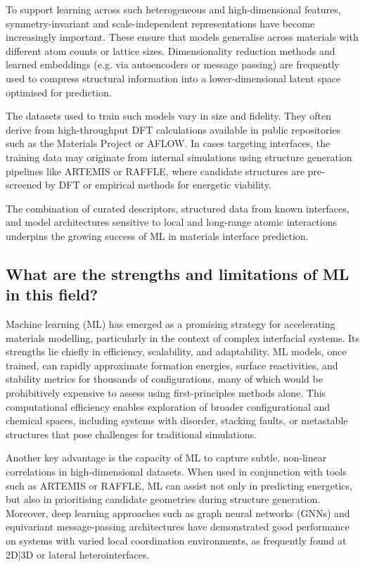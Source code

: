To support learning across such heterogeneous and high-dimensional features, symmetry-invariant and scale-independent
representations have become increasingly important. These ensure that models generalise across materials with different
atom counts or lattice sizes. Dimensionality reduction methods and learned embeddings (e.g. via autoencoders or message
passing) are frequently used to compress structural information into a lower-dimensional latent space optimised for
prediction.

The datasets used to train such models vary in size and fidelity. They often derive from high-throughput DFT
calculations available in public repositories such as the Materials Project or AFLOW. In cases targeting interfaces,
the training data may originate from internal simulations using structure generation pipelines like ARTEMIS or RAFFLE,
where candidate structures are pre-screened by DFT or empirical methods for energetic viability.

The combination of curated descriptors, structured data from known interfaces, and model architectures sensitive to
local and long-range atomic interactions underpins the growing success of ML in materials interface prediction.

\subsection{What are the strengths and limitations of ML in this field?}

Machine learning (ML) has emerged as a promising strategy for accelerating materials modelling, particularly in the
context of complex interfacial systems. Its strengths lie chiefly in efficiency, scalability, and adaptability. ML
models, once trained, can rapidly approximate formation energies, surface reactivities, and stability metrics for
thousands of configurations, many of which would be prohibitively expensive to assess using first-principles methods
alone. This computational efficiency enables exploration of broader configurational and chemical spaces, including
systems with disorder, stacking faults, or metastable structures that pose challenges for traditional simulations.

Another key advantage is the capacity of ML to capture subtle, non-linear correlations in high-dimensional datasets.
When used in conjunction with tools such as ARTEMIS or RAFFLE, ML can assist not only in predicting energetics, but
also in prioritising candidate geometries during structure generation. Moreover, deep learning approaches such as graph
neural networks (GNNs) and equivariant message-passing architectures have demonstrated good performance on systems with
varied local coordination environments, as frequently found at 2D|3D or lateral heterointerfaces.

